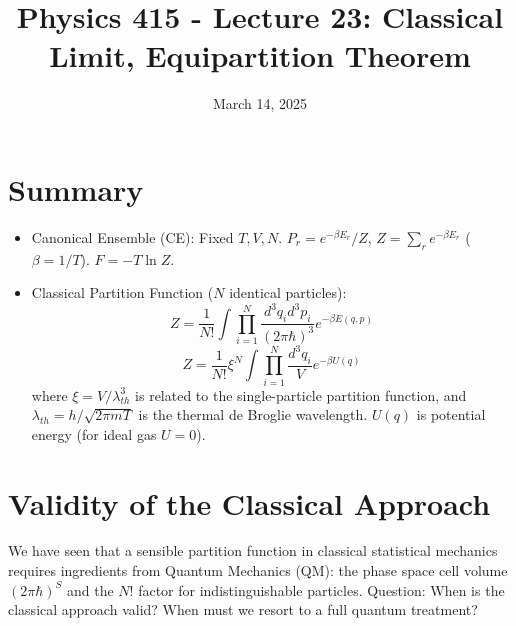 \documentclass[11pt]{article}
\title{Physics 415 - Lecture 23: Classical Limit, Equipartition Theorem}
\date{March 14, 2025}
\author{} %
\newcommand{\partfn}{Z} %
\newcommand{\lambdaT}{\lambda_{th}} %
\begin{document}
\maketitle
\thispagestyle{empty}

\section*{Summary}

\begin{itemize}
    \item Canonical Ensemble (CE): Fixed $T, V, N$. $P_r = e^{-\beta E_r} / \partfn$, $\partfn = \sum_r e^{-\beta E_r}$ ($\beta=1/T$). $F = -T \ln \partfn$.
    \item Classical Partition Function ($N$ identical particles):
    \[ \partfn = \frac{1}{N!} \int \prod_{i=1}^N \frac{d^3 q_i d^3 p_i}{(2\pi\hbar)^3} e^{-\beta E(q,p)} \]
    \[ \partfn = \frac{1}{N!} \xi^N \int \prod_{i=1}^N \frac{d^3 q_i}{V} e^{-\beta U(q)} \]
    where $\xi = V / \lambdaT^3$ is related to the single-particle partition function, and $\lambdaT = h / \sqrt{2\pi m T}$ is the thermal de Broglie wavelength. $U(q)$ is potential energy (for ideal gas $U=0$).
\end{itemize}

\section*{Validity of the Classical Approach}

We have seen that a sensible partition function in classical statistical mechanics requires ingredients from Quantum Mechanics (QM): the phase space cell volume $(2\pi\hbar)^S$ and the $N!$ factor for indistinguishable particles.
Question: When is the classical approach valid? When must we resort to a full quantum treatment?
\end{document}
